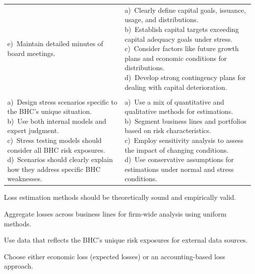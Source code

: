 \begin{minipage}{\textwidth}
\begin{tabularx}{\textwidth}{@{}YY@{}}
{e)~Maintain detailed minutes of board meetings.} &
{\tabfont
a)~Clearly define capital goals, issuance, usage, and distributions.\newline
b)~Establish capital targets exceeding capital adequacy goals under stress.\newline
c)~Consider factors like future growth plans and economic conditions for
distributions.\newline
d)~Develop strong contingency plans for dealing with capital deterioration.}\\
  & \\
{\tabfont
a)~Design stress scenarios specific to the BHC's unique situation.\newline
b)~Use both internal models and expert judgment.\newline
c)~Stress testing models should consider all BHC risk exposures.\newline
d)~Scenarios should clearly explain how they address specific BHC weaknesses.} &
{\tabfont
a)~Use a mix of quantitative and qualitative methods for estimations.\newline
b)~Segment business lines and portfolios based on risk characteristics.\newline
c)~Employ sensitivity analysis to assess the impact of changing conditions.\newline
d)~Use conservative assumptions for estimations under normal and stress
conditions.}\\
\end{tabularx}
\end{minipage}


\begin{lettered}
\item Loss estimation methods should be theoretically sound and empirically valid.
\item Aggregate losses across business lines for firm-wide analysis using uniform
methods.
\item Use data that reflects the BHC's unique risk exposures for external data
sources.
\item Choose either economic loss (expected losses) or an accounting-based loss
approach.
\end{lettered}


